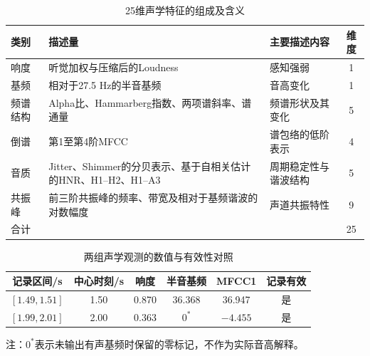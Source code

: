 \begin{table}[H]
    \centering\small
    \caption{25维声学特征的组成及含义}
    \label{tab:p1_acoustic_groups}
    \setlength{\tabcolsep}{6pt}
    \renewcommand{\arraystretch}{1.12}
    \ifdefined\pOneCompactTableBox\else\newsavebox{\pOneCompactTableBox}\fi
    \begin{lrbox}{\pOneCompactTableBox}
    \begin{tabular}{l>{\raggedright\arraybackslash}p{17em}>{\raggedright\arraybackslash}p{10em}c}
        \toprule
        类别 & 描述量 & 主要描述内容 & 维度\\
        \midrule
        响度 & 听觉加权与压缩后的Loudness & 感知强弱 & 1\\
        基频 & 相对于27.5 Hz的半音基频 & 音高变化 & 1\\
        频谱结构 & Alpha比、Hammarberg指数、两项谱斜率、谱通量 & 频谱形状及其变化 & 5\\
        倒谱 & 第1至第4阶MFCC & 谱包络的低阶表示 & 4\\
        音质 & Jitter、Shimmer的分贝表示、基于自相关估计的HNR、H1--H2、H1--A3 & 周期稳定性与谐波结构 & 5\\
        共振峰 & 前三阶共振峰的频率、带宽及相对于基频谐波的对数幅度 & 声道共振特性 & 9\\
        \midrule
        合计 & & & 25\\
        \bottomrule
    \end{tabular}
    \end{lrbox}
    \usebox{\pOneCompactTableBox}
\end{table}

\begin{table}[H]
    \centering\small
    \caption{两组声学观测的数值与有效性对照}
    \label{tab:p1_acoustic_example}
    \setlength{\tabcolsep}{6pt}
    \renewcommand{\arraystretch}{1.12}
    \ifdefined\pOneCompactTableBox\else\newsavebox{\pOneCompactTableBox}\fi
    \begin{lrbox}{\pOneCompactTableBox}
    \begin{tabular}{cccccc}
        \toprule
        记录区间/s & 中心时刻/s & 响度 & 半音基频 & MFCC1 & 记录有效\\
        \midrule
        $[1.49,1.51]$ & 1.50 & 0.870 & 36.368 & 36.947 & 是\\
        $[1.99,2.01]$ & 2.00 & 0.363 & $0^{\ast}$ & $-4.455$ & 是\\
        \bottomrule
    \end{tabular}
    \end{lrbox}
    \usebox{\pOneCompactTableBox}
\par\smallskip
\parbox{\wd\pOneCompactTableBox}{\footnotesize 注：$0^{\ast}$表示未输出有声基频时保留的零标记，不作为实际音高解释。}
\end{table}

